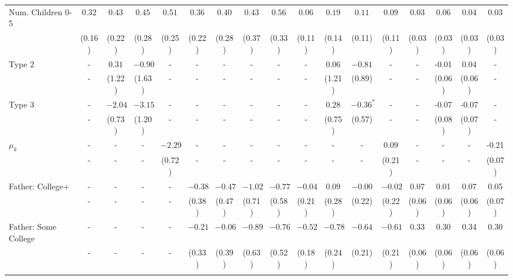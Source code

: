 \begin{tabular}{lcccccccccccccccc}
Num. Children 0-5&$0.32$&$0.43$&$0.45$&$0.51$&$0.36$&$0.40$&$0.43$&$0.56$&$0.06$&$0.19$&$0.11$&$0.09$&0.03&0.06&0.04&0.03\\
&(0.16)&(0.22)&(0.28)&(0.25)&(0.22)&(0.28)&(0.37)&(0.33)&(0.11)&(0.14)&(0.11)&(0.11)&(0.03)&(0.03)&(0.03)&(0.03)\\
Type 2&-&$0.31$&$-0.90$&-&-&-&-&-&-&$0.06$&$-0.81$&-&-&-0.01&0.04&-\\
&-&(1.22)&(1.63)&-&-&-&-&-&-&(1.21)&(0.89)&-&-&(0.06)&(0.06)&-\\
Type 3&-&$-2.04$&$-3.15$&-&-&-&-&-&-&$0.28$&$-0.36^{*}$&-&-&-0.07&-0.07&-\\
&-&(0.73)&(1.20)&-&-&-&-&-&-&(0.75)&(0.57)&-&-&(0.08)&(0.07)&-\\
$\mu_{k}$&-&-&-&$-2.29$&-&-&-&-&-&-&-&$0.09$&-&-&-&-0.21\\
&-&-&-&(0.72)&-&-&-&-&-&-&-&(0.21)&-&-&-&(0.07)\\
Father: College+&-&-&-&-&$-0.38$&$-0.47$&$-1.02$&$-0.77$&$-0.04$&$0.09$&$-0.00$&$-0.02$&0.07&0.01&0.07&0.05\\
&-&-&-&-&(0.38)&(0.47)&(0.71)&(0.58)&(0.21)&(0.28)&(0.22)&(0.22)&(0.06)&(0.06)&(0.06)&(0.07)\\
Father: Some College&-&-&-&-&$-0.21$&$-0.06$&$-0.89$&$-0.76$&$-0.52$&$-0.78$&$-0.64$&$-0.61$&0.33&0.30&0.34&0.30\\
&-&-&-&-&(0.33)&(0.39)&(0.63)&(0.52)&(0.18)&(0.24)&(0.21)&(0.21)&(0.06)&(0.06)&(0.06)&(0.06)\\
\\
\bottomrule\end{tabular}